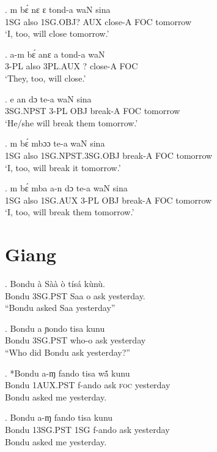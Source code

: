 \documentclass{assets/fieldnotes}
\begin{document}
\exg.
m     bɛ́     nɛ         ɛ     tond-a    waN   sina     \\
1SG   also   1SG.OBJ?   AUX   close-A   FOC   tomorrow \\%
`I, too, will close tomorrow.'

\exg.
a-m     bɛ́     anɛ    a   tond-a    waN \\
3-PL   also   3PL.AUX ?  close-A   FOC \\%
`They, too, will close.'


\exg.
e         an    dɔ    te-a      waN   sina     \\
3SG.NPST   3-PL   OBJ   break-A   FOC   tomorrow \\%
`He/she will break them tomorrow.'

\exg.
m     bɛ́     mbɔɔ              te-a      waN   sina     \\
1SG   also   1SG.NPST.3SG.OBJ   break-A   FOC   tomorrow \\%
`I, too, will break it tomorrow.'


\exg.
m     bɛ́     mba       a-n    dɔ    te-a      waN   sina     \\
1SG   also   1SG.AUX   3-PL   OBJ   break-A   FOC   tomorrow \\%
`I, too, will break them tomorrow.'


\section{Giang}


\exg. Bondu à Sàà ò tísá kùnù.\\
Bondu 3SG.PST Saa o ask yesterday.\\
``Bondu asked Saa yesterday''

\exg. Bondu a ɲondo tisa kunu\\
Bondu 3SG.PST who-o ask yesterday\\
``Who did Bondu ask yesterday?''

\exg. *Bondu a-ɱ fando tisa wã́ kunu\\
Bondu 1\textsc{AUX.PST} f-ando ask \textsc{foc} yesterday\\
Bondu asked me yesterday. 

\exg. Bondu a-ɱ fando tisa kunu\\
Bondu 1\textsc{3SG.PST} 1SG f-ando ask yesterday\\
Bondu asked me yesterday. 
\end{document}
